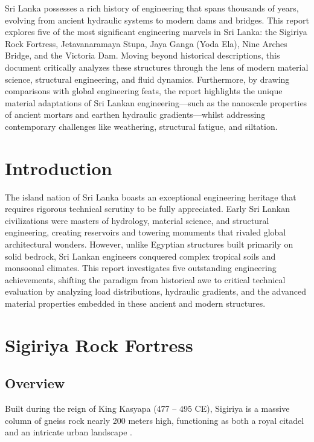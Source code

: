 \documentclass[12pt,a4paper]{report}
\begin{document}
	Sri Lanka possesses a rich history of engineering that spans thousands of years, evolving from ancient hydraulic systems to modern dams and bridges. This report explores five of the most significant engineering marvels in Sri Lanka: the Sigiriya Rock Fortress, Jetavanaramaya Stupa, Jaya Ganga (Yoda Ela), Nine Arches Bridge, and the Victoria Dam. Moving beyond historical descriptions, this document critically analyzes these structures through the lens of modern material science, structural engineering, and fluid dynamics. Furthermore, by drawing comparisons with global engineering feats, the report highlights the unique material adaptations of Sri Lankan engineering—such as the nanoscale properties of ancient mortars and earthen hydraulic gradients—whilst addressing contemporary challenges like weathering, structural fatigue, and siltation.
	
	\newpage
	\tableofcontents
	
	\newpage
	\listoffigures
	
	\newpage
	
	\listoftables
	\newpage
	
	\setcounter{page}{1}
	\onehalfspacing
	
	\chapter{Introduction}
	The island nation of Sri Lanka boasts an exceptional engineering heritage that requires rigorous technical scrutiny to be fully appreciated. Early Sri Lankan civilizations were masters of hydrology, material science, and structural engineering, creating reservoirs and towering monuments that rivaled global architectural wonders. However, unlike Egyptian structures built primarily on solid bedrock, Sri Lankan engineers conquered complex tropical soils and monsoonal climates. This report investigates five outstanding engineering achievements, shifting the paradigm from historical awe to critical technical evaluation by analyzing load distributions, hydraulic gradients, and the advanced material properties embedded in these ancient and modern structures.
	
	\chapter{Sigiriya Rock Fortress}
	\section{Overview}
	Built during the reign of King Kasyapa (477 – 495 CE), Sigiriya is a massive column of gneiss rock nearly 200 meters high, functioning as both a royal citadel and an intricate urban landscape \cite{bandaranayake}.
	
\end{document}
